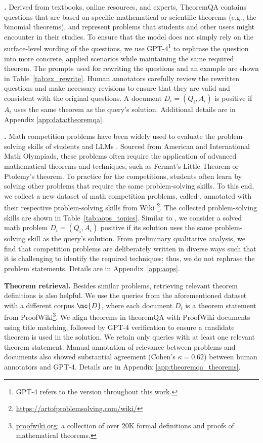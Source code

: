 \textbf{\theorem.}
Derived from textbooks, online resources, and experts, TheoremQA \citep{chen2023theoremqa} contains questions that are based on specific mathematical or scientific theorems (e.g., the binomial theorems), and represent problems that students and other users might encounter in their studies.
To ensure that the model does not simply rely on the surface-level wording of the questions, we use GPT-4\footnote{GPT-4 refers to the version  throughout this work.} to rephrase the question into more concrete, applied scenarios while maintaining the same required theorem.
The prompts used for rewriting the questions and an example are shown in Table~\ref{tab:ex_rewrite}.
Human annotators carefully review the rewritten questions and make necessary revisions to ensure that they are valid and consistent with the original questions.
A document $D_i = (Q_i, A_i)$ is positive if $A_i$ uses the same theorem as the query's solution.
Additional details are in Appendix \ref{app:data:theoremqa}.

\textbf{\aops.}
Math competition problems have been widely used to evaluate the problem-solving skills of students and LLMs \citep{hendrycks2021measuring}.
Sourced from American and International Math Olympiads, these problems often require the application of advanced mathematical theorems and techniques, such as Fermat's Little Theorem or Ptolemy's theorem.
To practice for the competitions, students often learn by solving other problems that require the same problem-solving skills. 
To this end, we collect a new dataset of math competition problems, called \aops, annotated with their respective problem-solving skills from \aops{} Wiki
\footnote{\url{https://artofproblemsolving.com/wiki/}}.
The collected problem-solving skills are shown in Table~\ref{tab:aops_topics}.
Similar to \theorem, we consider a solved math problem $D_i=(Q_i, A_i)$ positive if its solution uses the same problem-solving skill as the query's solution. 
From preliminary qualitative analysis, we find that competition problems are deliberately written in diverse ways such that it is challenging to identify the required techniques; thus, we do not rephrase the problem statements. Details are in Appendix~\ref{app:aops}.


\textbf{Theorem retrieval.} Besides similar problems, retrieving relevant theorem definitions is also helpful.
We use the queries from the aforementioned \theorem dataset with a different corpus $\mc{D}$, where each document $D_i$ is a theorem statement from ProofWiki\footnote{\href{https://proofwiki.org}{proofwiki.org}; a collection of over 20K formal definitions and proofs of mathematical theorems.}.
We align theorems in theoremQA with ProofWiki documents using title matching, followed by GPT-4 verification to ensure a candidate theorem is used in the solution. We retain only queries with at least one relevant theorem statement. Manual annotation of relevance between problems and documents also showed substantial agreement (Cohen's $\kappa = 0.62$) between human annotators and GPT-4. Details are in Appendix \ref{app:theoremqa_theorems}.